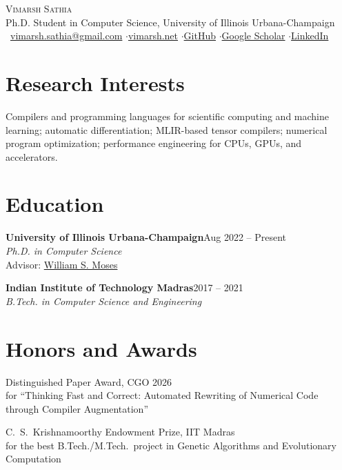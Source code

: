\documentclass[11pt,letterpaper]{article}
\newcommand{\entry}[2]{\needspace{2.5\baselineskip}\textbf{#1}\hfill #2\\}
\newenvironment{tagged}[1]{%
  \begin{description}[leftmargin=#1, labelwidth=\dimexpr#1-0.8em\relax,
    labelsep=0.8em, align=right, font=\normalfont, itemsep=1pt, topsep=1pt]}
  {\end{description}}
\begin{document}
\begin{center}
  {\Huge\scshape Vimarsh Sathia}\\[4pt]
  Ph.D. Student in Computer Science, University of Illinois Urbana-Champaign\\[2pt]
  \Letter~\href{mailto:vimarsh.sathia@gmail.com}{vimarsh.sathia@gmail.com}
  \enspace$\cdot$\enspace \href{https://vimarsh.net}{vimarsh.net}
  \enspace$\cdot$\enspace \href{https://github.com/vimarsh6739}{GitHub}
  \enspace$\cdot$\enspace \href{https://scholar.google.com/citations?user=Aryo7Y4AAAAJ}{Google Scholar}
  \enspace$\cdot$\enspace \href{https://www.linkedin.com/in/vimarsh-sathia-83a85810a/}{LinkedIn}
\end{center}

\section{Research Interests}
Compilers and programming languages for scientific computing and machine learning;
automatic differentiation; MLIR-based tensor compilers; numerical program optimization;
performance engineering for CPUs, GPUs, and accelerators.

\section{Education}
\entry{University of Illinois Urbana-Champaign}{Aug 2022 -- Present}
\textit{Ph.D. in Computer Science}\\
Advisor: \href{https://wsmoses.com/academic/}{William S. Moses}

\vspace{6pt}
\entry{Indian Institute of Technology Madras}{2017 -- 2021}
\textit{B.Tech. in Computer Science and Engineering}

\section{Honors and Awards}
\begin{tagged}{3.2em}
  \item[2026] Distinguished Paper Award, CGO 2026\\
    for ``Thinking Fast and Correct: Automated Rewriting of Numerical Code through Compiler Augmentation''
  \item[2021] C.~S.~Krishnamoorthy Endowment Prize, IIT Madras\\
    for the best B.Tech./M.Tech.\ project in Genetic Algorithms and Evolutionary Computation
\end{tagged}
\end{document}

